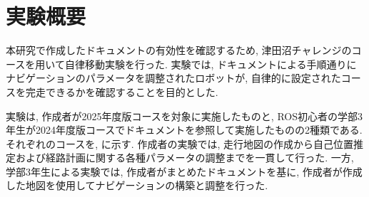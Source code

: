 \section{実験概要}
本研究で作成したドキュメントの有効性を確認するため, 津田沼チャレンジのコースを用いて自律移動実験を行った. 
実験では, ドキュメントによる手順通りにナビゲーションのパラメータを調整されたロボットが, 自律的に設定されたコースを完走できるかを確認することを目的とした. 

実験は, 作成者が2025年度版コースを対象に実施したものと, ROS初心者の学部3年生が2024年度版コースでドキュメントを参照して実施したものの2種類である. 
それぞれのコースを, に示す.
作成者の実験では, 走行地図の作成から自己位置推定および経路計画に関する各種パラメータの調整までを一貫して行った. 
一方, 学部3年生による実験では, 作成者がまとめたドキュメントを基に, 作成者が作成した地図を使用してナビゲーションの構築と調整を行った. 

